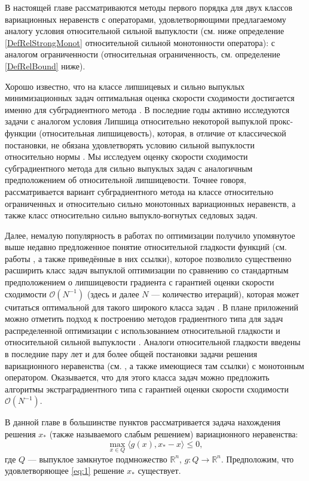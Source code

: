     В настоящей главе рассматриваются методы первого порядка для двух классов вариационных неравенств с операторами, удовлетворяющими предлагаемому аналогу условия относительной сильной выпуклости (см. ниже определение  \ref{DefRelStrongMonot} относительной сильной монотонности оператора): с аналогом ограниченности (относительная ограниченность, см. определение \ref{DefRelBound} ниже).

    Хорошо известно, что на классе липшицевых и сильно выпуклых минимизационных задач оптимальная оценка скорости сходимости достигается именно для субградиентного метода \cite{Bach_2012}. В последние годы активно исследуются задачи с аналогом условия Липшица относительно некоторой выпуклой прокс-функции (относительная липшицевость), которая, в отличие от классической постановки, не обязана удовлетворять условию сильной выпуклости относительно нормы \cite{AdaMirr_2021,Lu_2018,Zhou_NIPS_2020}. Мы исследуем оценку скорости сходимости субградиентного метода для сильно выпуклых задач с аналогичным предположением об относительной липшицевости. Точнее говоря, рассматривается вариант субградиентного метода на классе относительно ограниченных и относительно сильно монотонных вариационных неравенств, а также класс относительно сильно выпукло-вогнутых седловых задач. 

    Далее, немалую популярность в работах по оптимизации получило упомянутое выше недавно предложенное понятие относительной гладкости функций (см. работы \cite{Bauschke,Drag,Dragomir,Lu_Nesterov_2018}, а также приведённые в них ссылки), которое позволило существенно расширить класс задач выпуклой оптимизации по сравнению со стандартным предположением о липшицевости градиента с гарантией оценки скорости сходимости $\mathcal{O}(N^{-1})$ (здесь и далее $N$ --- количество итераций), которая может считаться оптимальной для такого широкого класса задач \cite{Dragomir}. В плане приложений можно отметить подход к построению методов градиентного типа для задач распределенной оптимизации с использованием относительной гладкости и относительной сильной выпуклости \cite{Hendr}. Аналоги относительной гладкости введены в последние пару лет и для более общей постановки задачи решения вариационного неравенства (см. \cite{Inex}, а также имеющиеся там ссылки) с монотонным оператором. Оказывается, что для этого класса задач можно предложить алгоритмы экстраградиентного типа с гарантией оценки скорости сходимости $\mathcal{O}(N^{-1})$. 

    В данной главе в большинстве пунктов рассматривается задача нахождения решения $x_*$ (также называемого слабым решением) вариационного неравенства: 
    \begin{equation}\label{eq:1}
        \max_{x \in Q} \langle g(x), x_* - x \rangle \leq 0,
    \end{equation}
    где $Q$ --- выпуклое замкнутое подмножество $\mathbb{R}^n$,
    $g: Q \longrightarrow \mathbb{R}^n$. Предположим, что удовлетворяющее \eqref{eq:1} решение $x_*$ существует.


